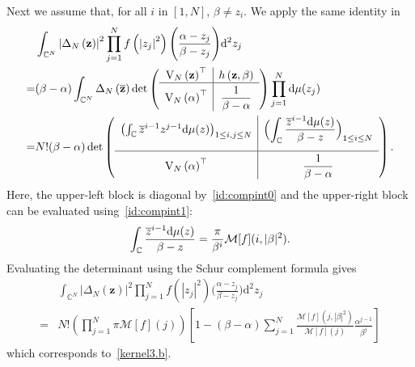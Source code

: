 \documentclass[pdflatex,sn-mathphys-num]{sn-jnl}
\theoremstyle{thmstyleone}
\numberwithin{equation}{section}
\newcommand{\C}{\mathbb{C}}
\begin{document}
\begin{appendices}
Next we assume that, for all $i$ in $[1,N]$, $\beta\neq z_{i}$. We apply the same identity in
\begin{equation}
\begin{split}
        &\int_{\C^{N}}^{} \left | \Delta_{N}\left ( \mathbf{z} \right ) \right |^{2}\prod\limits_{j=1}^{N}f\left ( \left | z_{j} \right |^{2} \right )\Bigg(\frac{ \alpha-z_{j} }{\beta-z_{j}}\Bigg)\mathrm{d}^{2}z_j\\
        =&(\beta-\alpha)\int_{\C^{N}}^{} \Delta_{N}\left ( \overline{\mathbf{z}} \right ) \det\left(\begin{array}{c|c}
\mathrm{V}_{N}\left( \textbf{z} \right)^{\top} & h\left( \textbf{z},\beta \right) \\ \hline
\mathrm{V}_{N}\left( \alpha \right)^{\top} & \displaystyle\overset{}{\frac{1}{\beta-\alpha}}
\end{array}\right)\prod\limits_{j=1}^{N}\mathrm{d}\mu(z_j)\\
=&N!(\beta-\alpha)\det\left(\begin{array}{c|c}
\left(\int_{\C}\overline{z}^{i-1}z^{j-1}\mathrm{d}\mu(z) \right)_{1\leq i,j\leq N} & \displaystyle\underset{}{\Bigl(\int_{\C}\frac{\overline{z}^{i-1}{\rm d}\mu(z)}{\beta-z}\Bigl)_{1\leq i\leq N}}\\ \hline
\mathrm{V}_{N}\left( \alpha \right)^{\top} & \displaystyle\overset{}{\frac{1}{\beta-\alpha}}
\end{array}\right).
\end{split}
\end{equation}
Here, the upper-left block is diagonal by~\eqref{id:compint0} and the upper-right block can be evaluated using~\eqref{id:compint1}:
\begin{equation}
    \int_{\C}\frac{\overline{z}^{i-1}{\rm d}\mu(z)}{\beta-z}=\frac{\pi}{\beta^i}\mathcal{M}[f](i,|\beta|^2).    
\end{equation}
Evaluating the determinant using the Schur complement formula gives
\begin{equation}
    \begin{split}
        &\int_{\C^{N}}^{} \left | \Delta_{N}\left ( \mathbf{z} \right ) \right |^{2}\prod\limits_{j=1}^{N}f\left ( \left | z_{j} \right |^{2} \right )\Bigg(\frac{ \alpha-z_{j} }{\beta-z_{j}}\Bigg)\mathrm{d}^{2}z_j\\
=&N!\left(\prod_{j=1}^{N}\pi\mathcal{M}[f](j)\right)\left[1-(\beta-\alpha)\sum_{j=1}^{N}\frac{\mathcal{M}[f](j,|\beta|^2)}{\mathcal{M}[f](j)}\frac{\alpha^{j-1}}{\beta^{j}}\right]
    \end{split}
    \end{equation}
which corresponds to~\eqref{kernel3.b}.


\end{appendices}
\end{document}
